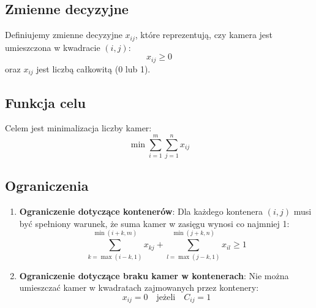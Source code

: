 \documentclass[12pt, letterpaper]{article}
\begin{document}
\subsection{Zmienne decyzyjne}
Definiujemy zmienne decyzyjne \( x_{ij} \), które reprezentują, czy kamera jest
umieszczona w kwadracie \( (i, j) \):
\[
  x_{ij} \geq 0
\]
oraz \( x_{ij} \) jest liczbą całkowitą (0 lub 1).

\subsection{Funkcja celu}
Celem jest minimalizacja liczby kamer:
\[
  \min \sum_{i=1}^{m} \sum_{j=1}^{n} x_{ij}
\]

\subsection{Ograniczenia}
\begin{enumerate}
  \item \textbf{Ograniczenie dotyczące kontenerów}:
        Dla każdego kontenera \( (i, j) \) musi być spełniony warunek, że suma
        kamer w zasięgu wynosi co najmniej 1:
        \[
          \sum_{k=\max(i-k, 1)}^{\min(i+k, m)} x_{kj} + \sum_{l=\max(j-k,
            1)}^{\min(j+k, n)}
          x_{il} \geq 1
        \]

  \item \textbf{Ograniczenie dotyczące braku kamer w kontenerach}:
        Nie można umieszczać kamer w kwadratach zajmowanych przez kontenery:
        \[
          x_{ij} = 0 \quad \text{jeżeli} \quad C_{ij} = 1
        \]
\end{enumerate}
\end{document}
